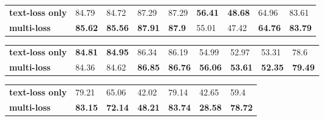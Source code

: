 \documentclass[11pt]{article}
\begin{document}
\begin{table*}
\centering
\begin{subtable}{\textwidth}
\centering
\small
\setlength{\tabcolsep}{3pt}
\renewcommand{\arraystretch}{1.2}
\begin{tabular}{lllllllll}
\hline
 &  &  &  &  &  &  &  &  \\ \hline
\textbf{text-loss only} & 84.79 & 84.72 & 87.29 & 87.29 & \textbf{56.41} & \textbf{48.68} & 64.96 & 83.61 \\ \hline
\textbf{multi-loss} & \textbf{85.62} & \textbf{85.56} & \textbf{87.91} & \textbf{87.9} & 55.01 & 47.42 & \textbf{64.76} & \textbf{83.79} \\ \hline
\end{tabular}
\caption{CMU-MOSI}
\label{tab:CMU-MOSI3}
\end{subtable}
\vspace{0.3cm}
\begin{subtable}{\textwidth}
\centering
\small
\setlength{\tabcolsep}{3pt}
\renewcommand{\arraystretch}{1.2}
\begin{tabular}{lllllllll}
\hline
 &  &  &  &  &  &  &  &  \\ \hline
\textbf{text-loss only} & \textbf{84.81} & \textbf{84.95} & 86.34 & 86.19 & 54.99 & 52.97 & 53.31 & 78.6 \\ \hline
\textbf{multi-loss} & 84.36 & 84.62 & \textbf{86.85} & \textbf{86.76} & \textbf{56.06} & \textbf{53.61} & \textbf{52.35} & \textbf{79.49} \\ \hline
\end{tabular}
\caption{CMU-MOSEI}
\label{tab:CMU-MOSEI4}
\end{subtable}
\vspace{0.3cm}
\begin{subtable}{\textwidth}
\centering
\small
\setlength{\tabcolsep}{3pt}
\renewcommand{\arraystretch}{1.2}
\begin{tabular}{lllllll}
\hline
 &  &  &  &  &  &  \\ \hline
\textbf{text-loss only} & 79.21 & 65.06 & 42.02 & 79.14 & 42.65 & 59.4 \\ \hline
\textbf{multi-loss} & \textbf{83.15} & \textbf{72.14} & \textbf{48.21} & \textbf{83.74} & \textbf{28.58} & \textbf{78.72} \\ \hline
\end{tabular}
\caption{CH-SIMS}
\label{tab:CH-SIMS4}
\end{subtable}
\caption{\textbf{Impact of Multi-Loss on Text Subnet}: Utilizing audio-related losses can enhance performance of the text subnet, even when identical labels are employed, as is the case with CMU-MOSEI. Remarkably, using specific labels for different modalities results in a substantial performance boost in the text subnet, as evidenced by the results from CH-SIMS.}
\label{tab:Performance5}
\end{table*}
\end{document}
